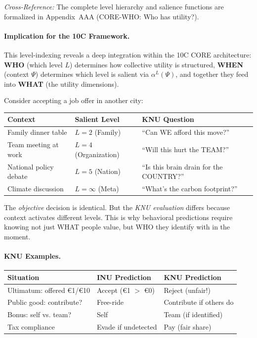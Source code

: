 \textit{Cross-Reference:} The complete level hierarchy and salience functions are
formalized in Appendix~AAA (CORE-WHO: Who has utility?).

\paragraph{Implication for the 10C Framework.}
This level-indexing reveals a deep integration within the 10C CORE architecture:
\textbf{WHO} (which level $L$) determines how collective utility is structured,
\textbf{WHEN} (context $\Psi$) determines which level is salient via $\alpha^L(\Psi)$,
and together they feed into \textbf{WHAT} (the utility dimensions).

\begin{tcolorbox}[colback=yellow!5!white, colframe=yellow!75!black,
    title=\textbf{The Same Decision, Different Level Activation}]
Consider accepting a job offer in another city:

\begin{center}
\renewcommand{\arraystretch}{1.2}
\begin{tabular}{lll}
\toprule
\textbf{Context} & \textbf{Salient Level} & \textbf{KNU Question} \\
\midrule
Family dinner table & $L=2$ (Family) & ``Can WE afford this move?'' \\
Team meeting at work & $L=4$ (Organization) & ``Will this hurt the TEAM?'' \\
National policy debate & $L=5$ (Nation) & ``Is this brain drain for the COUNTRY?'' \\
Climate discussion & $L=\infty$ (Meta) & ``What's the carbon footprint?'' \\
\bottomrule
\end{tabular}
\end{center}

The \emph{objective} decision is identical. But the \emph{KNU evaluation} differs
because context activates different levels. This is why behavioral predictions
require knowing not just WHAT people value, but WHO they identify with in the moment.
\end{tcolorbox}

\paragraph{KNU Examples.}

\begin{center}
\renewcommand{\arraystretch}{1.3}
\begin{tabular}{p{4cm}p{4cm}p{4cm}}
\toprule
\textbf{Situation} & \textbf{INU Prediction} & \textbf{KNU Prediction} \\
\midrule
Ultimatum: offered \euro{1}/\euro{10} & Accept (\euro{1} $>$ \euro{0}) & Reject (unfair!) \\
Public good: contribute? & Free-ride & Contribute if others do \\
Bonus: self vs. team? & Self & Team (if identified) \\
Tax compliance & Evade if undetected & Pay (fair share) \\
\bottomrule
\end{tabular}
\end{center}

